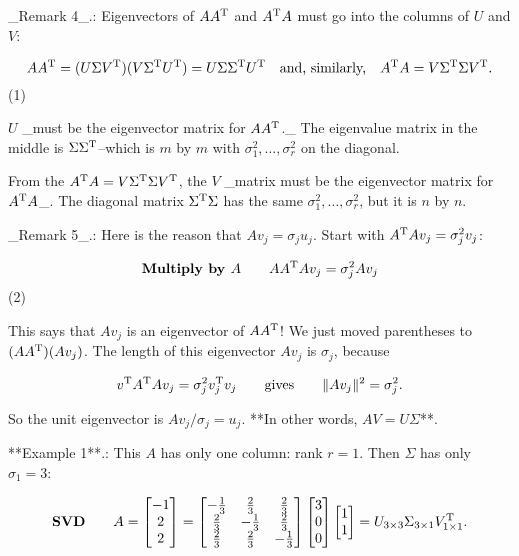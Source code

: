 _Remark 4_.: Eigenvectors of \(AA^{\rm T}\) and \(A^{\rm T}A\) must go into the columns of \(U\) and \(V\):

\[AA^{\rm T}=(U\Sigma V^{\rm T})(V\Sigma^{\rm T}U^{\rm T})=U\Sigma\Sigma^{\rm T}U^{ \rm T}\quad\text{and, similarly,}\quad A^{\rm T}A=V\Sigma^{\rm T}\Sigma V^{\rm T}.\] (1)

\(U\) _must be the eigenvector matrix for \(AA^{\rm T}\)._ The eigenvalue matrix in the middle is \(\Sigma\Sigma^{\rm T}\)--which is \(m\) by \(m\) with \(\sigma_{1}^{2},\ldots,\sigma_{r}^{2}\) on the diagonal.

From the \(A^{\rm T}A=V\Sigma^{\rm T}\Sigma V^{\rm T}\), the \(V\) _matrix must be the eigenvector matrix for \(A^{\rm T}A\)_. The diagonal matrix \(\Sigma^{\rm T}\Sigma\) has the same \(\sigma_{1}^{2},\ldots,\sigma_{r}^{2}\), but it is \(n\) by \(n\).

_Remark 5_.: Here is the reason that \(Av_{j}=\sigma_{j}u_{j}\). Start with \(A^{\rm T}Av_{j}=\sigma_{j}^{2}v_{j}\):

\[\text{\bf Multiply by }A\qquad AA^{\rm T}Av_{j}=\sigma_{j}^{2}Av_{j}\] (2)

This says that \(Av_{j}\) is an eigenvector of \(AA^{\rm T}\)! We just moved parentheses to \((AA^{\rm T})(Av_{j})\). The length of this eigenvector \(Av_{j}\) is \(\sigma_{j}\), because

\[v^{\rm T}A^{\rm T}Av_{j}=\sigma_{j}^{2}v_{j}^{\rm T}v_{j}\qquad\text{gives} \qquad\|Av_{j}\|^{2}=\sigma_{j}^{2}.\]

So the unit eigenvector is \(Av_{j}/\sigma_{j}=u_{j}\). **In other words, \(AV=U\Sigma\)**.

**Example 1**.: This \(A\) has only one column: rank \(r=1\). Then \(\Sigma\) has only \(\sigma_{1}=3\):

\[\text{\bf SVD}\qquad A=\begin{bmatrix}-1\\ 2\\ 2\end{bmatrix}=\begin{bmatrix}-\frac{1}{3}&\frac{2}{3}&\frac{2}{3}\\ \frac{2}{3}&-\frac{1}{3}&\frac{2}{3}\\ \frac{2}{3}&\frac{2}{3}&-\frac{1}{3}\end{bmatrix}\begin{bmatrix}3\\ 0\\ 0\end{bmatrix}\begin{bmatrix}1\\ 1\end{bmatrix}=U_{3\times 3}\Sigma_{3\times 1}V_{1\times 1}^{\rm T}.\]


